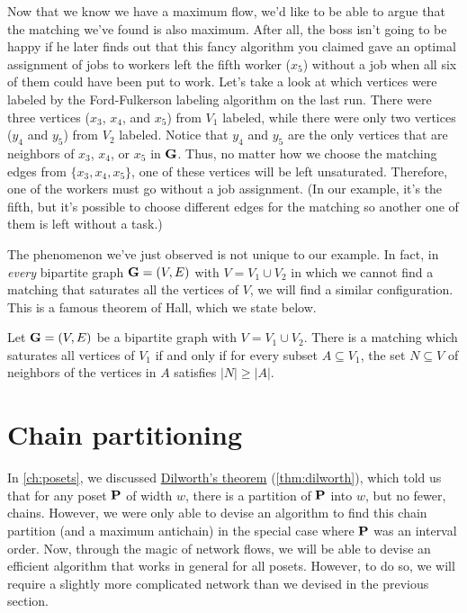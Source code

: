 Now that we know we have a maximum flow, we'd like to be able to argue
that the matching we've found is also maximum. After all, the boss
isn't going to be happy if he later finds out that this fancy
algorithm you claimed gave an optimal assignment of jobs to workers
left the fifth worker ($x_5$) without a job when all six of them could
have been put to work. Let's take a look at which vertices were
labeled by the Ford-Fulkerson labeling algorithm on the last
run. There were three vertices ($x_3$, $x_4$, and $x_5$) from $V_1$
labeled, while there were only two vertices ($y_4$ and $y_5$) from
$V_2$ labeled. Notice that $y_4$ and $y_5$ are the only vertices that
are neighbors of $x_3$, $x_4$, or $x_5$ in $\mathbf{G}$. Thus, no matter how
we choose the matching edges from $\{x_3,x_4,x_5\}$, one of these
vertices will be left unsaturated. Therefore, one of the workers must
go without a job assignment. (In our example, it's the fifth, but it's
possible to choose different edges for the matching so another one of
them is left without a task.)

The phenomenon we've just observed is not unique to our example. In
fact, in \emph{every} bipartite graph $\mathbf{G}=(V,E)$ with $V=V_1\cup V_2$ in
which we cannot find a matching that saturates all the vertices of $V$,
we will find a similar configuration. This is a famous theorem of
Hall, which we state below.

\begin{theorem}[Hall]\label{thm:flowapplications:hall}
  Let $\mathbf{G}=(V,E)$ be a bipartite graph with $V=V_1\cup V_2$. There is a
  matching which saturates all vertices of $V_1$ if and only if for
  every subset $A\subseteq V_1$, the set $N\subseteq V$ of neighbors
  of the vertices in $A$ satisfies $|N|\geq |A|$.
\end{theorem}
\section{Chain partitioning}\label{s:flowapplications:chain-partition}

In \autoref{ch:posets}, we discussed
\hyperref[thm:dilworth]{Dilworth's theorem} (\autoref{thm:dilworth}),
which told us that for any poset $\mathbf{P}$ of width $w$, there is a
partition of $\mathbf{P}$ into $w$, but no fewer, chains. However, we were
only able to devise an algorithm to find this chain partition (and a
maximum antichain) in the special case where $\mathbf{P}$ was an interval
order. Now, through the magic of network flows, we will be able to
devise an efficient algorithm that works in general for all
posets. However, to do so, we will require a slightly more complicated
network than we devised in the previous section.

